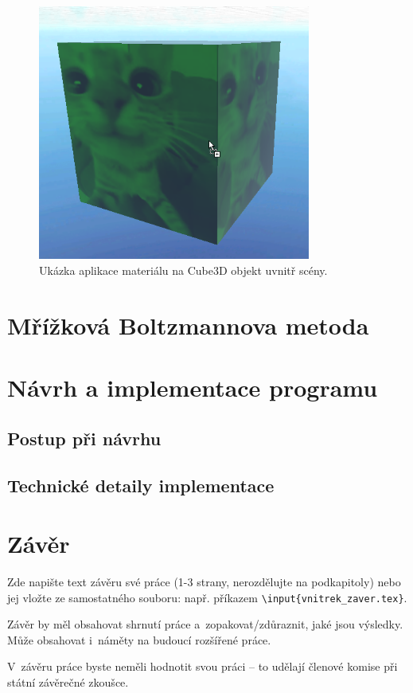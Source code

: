 \documentclass[a4paper,oneside,12pt]{book}
\begin{document}
\begin{figure}[H]
	\centering
	\includegraphics[width=0.8\textwidth]{obrazky/unity_material_drop.png}
	\caption{Ukázka aplikace materiálu na Cube3D objekt uvnitř scény.}
	\label{fig:unity_material_drop}
\end{figure}


\chapter{Mřížková Boltzmannova metoda}

\chapter{Návrh a implementace programu}
\section{Postup při návrhu}


\section{Technické detaily implementace}

\chapter*{Závěr}
%
Zde napište text závěru své práce (1-3 strany, nerozdělujte na podkapitoly) nebo jej vložte ze samostatného souboru: např. příkazem \texttt{\textbackslash input\{vnitrek\_zaver.tex\}}. \par Závěr by měl obsahovat shrnutí práce a~zopakovat/zdůraznit, jaké jsou výsledky. Může obsahovat i~náměty na budoucí rozšířené práce. \par V~závěru práce byste neměli hodnotit svou práci -- to udělají členové komise při státní závěrečné zkoušce.
%
%
\end{document}
